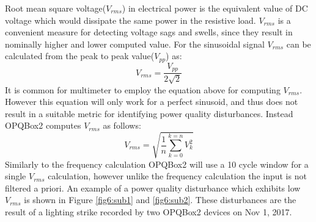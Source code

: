 Root mean square voltage($V_{rms}$) in electrical power is the equivalent value of DC voltage which would dissipate the same power in the resistive load. $V_{rms}$ is a convenient measure for detecting voltage sags and swells, since they result in nominally higher and lower computed value. For the sinusoidal signal $V_{rms}$ can be calculated from the peak to peak value($V_{pp}$) as:
\begin{equation} \label{eq:2}
	V_{rms} = \frac{V_{pp}}{2\sqrt{2}}
\end{equation}
It is common for multimeter to employ the equation above for computing $V_{rms}$. However this equation will only work for a perfect sinusoid, and thus does not result in a suitable metric for identifying power quality disturbances. Instead OPQBox2 computes $V_{rms}$ as follows:
\begin{equation} \label{eq:3}
	V_{rms} = \sqrt{\frac{1}{n}\sum\limits_{k=0}^{k=n}V_{k}^{2}}
\end{equation}
Similarly to the frequency calculation OPQBox2 will use a 10 cycle window for a single $V_{rms}$ calculation, however unlike the frequency calculation the input is not filtered a priori. An example of a power quality disturbance which exhibits low $V_{rms}$ is shown in Figure \ref{fig6:sub1} and \ref{fig6:sub2}. These disturbances are the result of a lighting strike recorded by two OPQBox2 devices on Nov 1, 2017.

